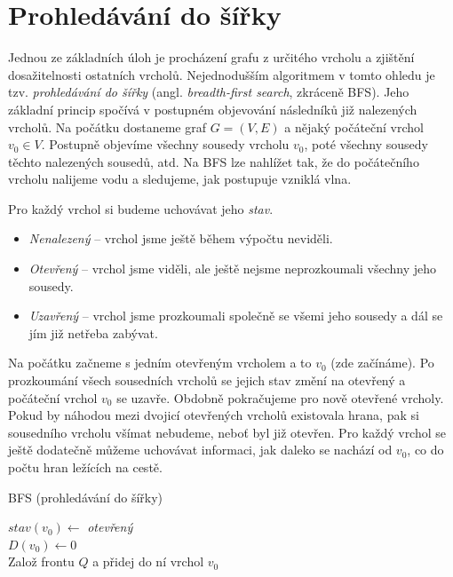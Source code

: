 \section{Prohledávání do šířky}\label{sec:bfs}

Jednou ze základních úloh je procházení grafu z určitého vrcholu a zjištění dosažitelnosti ostatních vrcholů. Nejednodušším algoritmem v tomto ohledu je tzv. \emph{prohledávání do šířky} (angl. \emph{breadth-first search}, zkráceně BFS). Jeho základní princip spočívá v postupném objevování následníků již nalezených vrcholů. Na počátku dostaneme graf $G=(V,E)$ a nějaký počáteční vrchol $v_0\in V$. Postupně objevíme všechny sousedy vrcholu $v_0$, poté všechny sousedy těchto nalezených sousedů, atd. Na BFS lze nahlížet tak, že do počátečního vrcholu nalijeme vodu a sledujeme, jak postupuje vzniklá vlna.

Pro každý vrchol si budeme uchovávat jeho \emph{stav}.
\begin{itemize}
    \item \emph{Nenalezený} -- vrchol jsme ještě během výpočtu neviděli.
    \item \emph{Otevřený} -- vrchol jsme viděli, ale ještě nejsme neprozkoumali všechny jeho sousedy.
    \item \emph{Uzavřený} -- vrchol jsme prozkoumali společně se všemi jeho sousedy a dál se jím již netřeba zabývat.
\end{itemize}
Na počátku začneme s jedním otevřeným vrcholem a to $v_0$ (zde začínáme). Po prozkoumání všech sousedních vrcholů se jejich stav změní na otevřený a počáteční vrchol $v_0$ se uzavře. Obdobně pokračujeme pro nově otevřené vrcholy. Pokud by náhodou mezi dvojicí otevřených vrcholů existovala hrana, pak si sousedního vrcholu všímat nebudeme, neboť byl již otevřen. Pro každý vrchol se ještě dodatečně můžeme uchovávat informaci, jak daleko se nachází od $v_0$, co do počtu hran ležících na cestě.
\begin{algorithm}\label{alg:bfs}
    \caption{BFS (prohledávání do šířky)}
    $stav(v_0)\gets$ \textit{otevřený}\\
    $D(v_0)\gets 0$\\
    Založ frontu $Q$ a přidej do ní vrchol $v_0$\\
\end{algorithm}

